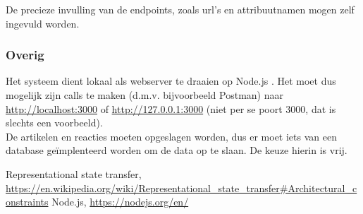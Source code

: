 \documentclass[a4paper]{article}
\begin{document}
De precieze invulling van de endpoints, zoals url's en attribuutnamen mogen zelf ingevuld worden.


\subsubsection{Overig}
Het systeem dient lokaal als webserver te draaien op Node.js \cite{node}. Het moet dus mogelijk zijn calls te maken (d.m.v. bijvoorbeeld Postman) naar \url{http://localhost:3000} of \url{http://127.0.0.1:3000} (niet per se poort 3000, dat is slechts een voorbeeld).\\

De artikelen en reacties moeten opgeslagen worden, dus er moet iets van een database ge\"implenteerd worden om de data op te slaan. De keuze hierin is vrij.

\begin{thebibliography}{9}
Representational state transfer,
\url{https://en.wikipedia.org/wiki/Representational_state_transfer#Architectural_constraints}
Node.js,
\url{https://nodejs.org/en/}

\end{thebibliography}
\end{document}
